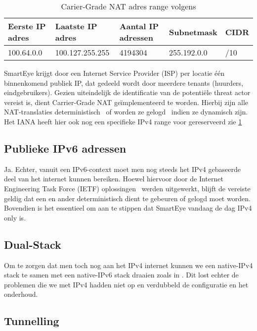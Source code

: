 \begin{table}[!htbp]
    \caption{Carier-Grade NAT adres range volgens \textcite{Weil2012}}
    \label{tab:Carrier-GradeNATAdressRanges}
    \begin{tabular}{lllll}
        \hline
        \multicolumn{1}{|l|}{Eerste IP adres} & \multicolumn{1}{l|}{Laatste IP adres} & \multicolumn{1}{l|}{Aantal IP adressen} & \multicolumn{1}{l|}{Subnetmask} & \multicolumn{1}{l|}{CIDR} \\ \hline
        100.64.0.0                            & 100.127.255.255                     & 4194304                                       & 255.192.0.0                   & /10
    \end{tabular}
\end{table}

SmartEye krijgt door een Internet Service Provider (ISP) per locatie één binnenkomend publiek IP, dat gedeeld wordt door meerdere tenants (huurders, eindgebruikers). Gezien uiteindelijk de identificatie van de potentiële threat actor vereist is, dient Carrier-Grade NAT geïmplementeerd te worden. Hierbij zijn alle NAT-translaties deterministisch~\autocite{Donley2014} of worden ze gelogd~\autocite{Perreault2013} indien ze dynamisch zijn. Het IANA heeft hier ook nog een specifieke IPv4 range voor gereserveerd zie \ref{tab:Carrier-GradeNATAdressRanges}

\subsection{Publieke IPv6 adressen}
Ja. Echter, vanuit een IPv6-context moet men nog steeds het IPv4 gebaseerde deel van het internet kunnen bereiken. Hoewel hiervoor door de Internet Engineering Task Force (IETF) oplossingen~\autocite{Arkko2011} werden uitgewerkt, blijft de vereiste geldig dat een en ander deterministisch dient te gebeuren of gelogd moet worden. Bovendien is het essentieel om aan te stippen dat SmartEye vandaag de dag IPv4 only is.

\subsection{Dual-Stack}
Om te zorgen dat men toch nog aan het IPv4 internet kunnen  we een native-IPv4 stack te samen met een native-IPv6 stack  draaien zoals in \textcite{Gilligan2005}. Dit lost echter de problemen die we met IPv4 hadden niet op en verdubbeld de configuratie en het onderhoud.

\subsection{Tunnelling}
